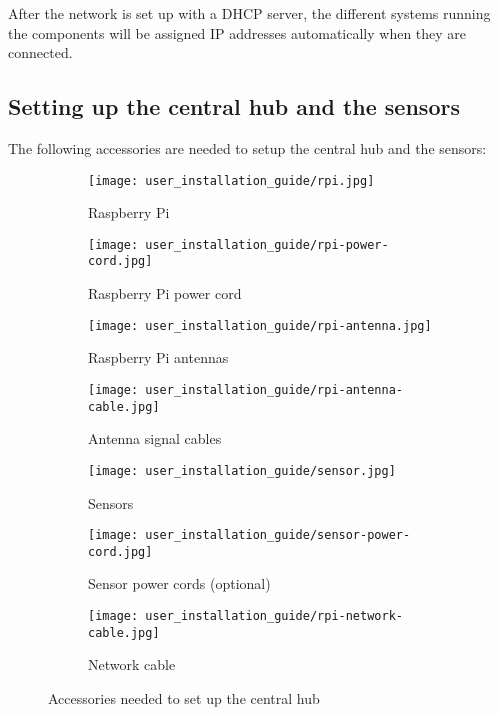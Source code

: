 \documentclass[../document.tex]{subfiles}
\begin{document}
After the network is set up with a \gls{DHCP} server, the different systems running the components will be assigned IP addresses automatically when they are connected.



\subsection{Setting up the central hub and the sensors}
The following accessories are needed to setup the central hub and the sensors:
\nopagebreak
\newcommand{\Imwidth}{0.40}
\begin{figure}[H]
	\centering
	\begin{subfigure}[h]{\Imwidth\textwidth}
		\texttt{[image: user\_installation\_guide/rpi.jpg]}
		\caption{\gls{Raspberry Pi}}	
	\end{subfigure}
	\quad
	\begin{subfigure}[h]{\Imwidth\textwidth}
		\texttt{[image: user\_installation\_guide/rpi-power-cord.jpg]}
		\caption{\gls{Raspberry Pi} power cord}	
	\end{subfigure}
	\quad
	\begin{subfigure}[h]{\Imwidth\textwidth}
		\texttt{[image: user\_installation\_guide/rpi-antenna.jpg]}
		\caption{\gls{Raspberry Pi} antennas}	
	\end{subfigure}
	\quad
	\begin{subfigure}[h]{\Imwidth\textwidth}
		\texttt{[image: user\_installation\_guide/rpi-antenna-cable.jpg]}
		\caption{Antenna signal cables}	
	\end{subfigure}
	\quad
	\begin{subfigure}[h]{\Imwidth\textwidth}
		\texttt{[image: user\_installation\_guide/sensor.jpg]}
		\caption{Sensors}	
	\end{subfigure}
	\quad
	\begin{subfigure}[h]{\Imwidth\textwidth}
		\texttt{[image: user\_installation\_guide/sensor-power-cord.jpg]}
		\caption{Sensor power cords (optional)}	
	\end{subfigure}
	\quad
	\begin{subfigure}[h]{\Imwidth\textwidth}
		\texttt{[image: user\_installation\_guide/rpi-network-cable.jpg]}
		\caption{Network cable}	
	\end{subfigure}
	\caption{Accessories needed to set up the central hub}
\end{figure}
\end{document}
